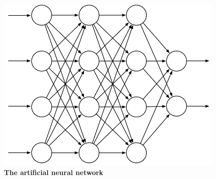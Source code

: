 \documentclass[11pt]{article}
\begin{document}
\begin{figure}
\begin{minipage}[t]{1\linewidth}
  \centering
  \centerline{\includegraphics[scale = 0.3]{ANN.png}}
\end{minipage}
\caption{\footnotesize{\textbf{The artificial neural network}}}
\label{fig: tile_coding}
\end{figure}


\newpage


\end{document}
